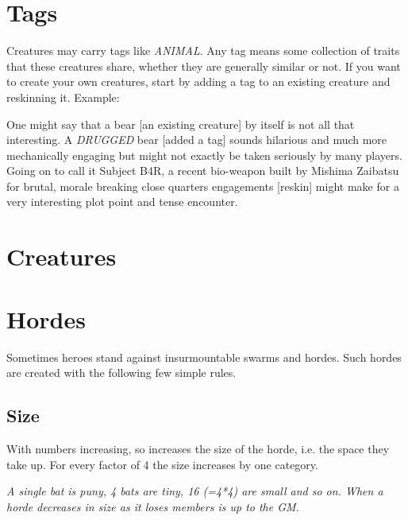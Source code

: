 \documentclass[12pt,a4paper,openany]{book}
\begin{document}
	\section{Tags}
	Creatures may carry tags like \emph{ANIMAL}. Any tag means some collection of traits that these creatures share, whether they are generally similar or not. If you want to create your own creatures, start by adding a tag to an existing creature and reskinning it. Example:\par
	\begin{exampleblock}
		One might say that a bear [an existing creature] by itself is not all that interesting. A \emph{DRUGGED} bear [added a tag] sounds hilarious and much more mechanically engaging but might not exactly be taken seriously by many players. Going on to call it Subject B4R, a recent bio-weapon built by Mishima Zaibatsu for brutal, morale breaking close quarters engagements [reskin] might make for a very interesting plot point and tense encounter.
	\end{exampleblock}
	
	\vspace{5mm}
	

	\section{Creatures}
	

	\section{Hordes}
	Sometimes heroes stand against insurmountable swarms and hordes. Such hordes are created with the following few simple rules.
	
	\subsection*{Size}
	With numbers increasing, so increases the size of the horde, i.e. the space they take up. For every factor of 4 the size increases by one category.
	\begin{exampleblock}
		\itshape A single bat is puny, 4 bats are tiny, 16 (=4*4) are small and so on. When a horde decreases in size as it loses members is up to the GM.
	\end{exampleblock}
	
\end{document}
